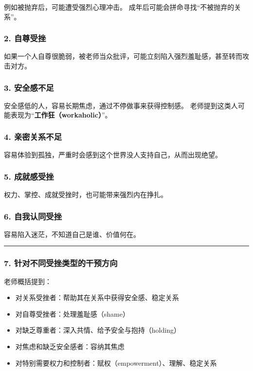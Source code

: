 \documentclass[
  chinese,
  9pt,
  a4paper,
]{ctexart}
\providecommand{\tightlist}{%
  \setlength{\itemsep}{0pt}\setlength{\parskip}{0pt}}
\begin{document}
例如被抛弃后，可能遭受强烈心理冲击。
成年后可能会拼命寻找``不被抛弃的关系''。

\subsubsection{2. 自尊受挫}\label{ux81eaux5c0aux53d7ux632b}

如果一个人自尊很脆弱，被老师当众批评，可能立刻陷入强烈羞耻感，甚至转而攻击对方。

\subsubsection{3. 安全感不足}\label{ux5b89ux5168ux611fux4e0dux8db3}

安全感低的人，容易长期焦虑，通过不停做事来获得控制感。
老师提到这类人可能表现为``\textbf{工作狂（workaholic）}''。

\subsubsection{4.
亲密关系不足}\label{ux4eb2ux5bc6ux5173ux7cfbux4e0dux8db3}

容易体验到孤独，严重时会感到这个世界没人支持自己，从而出现绝望。

\subsubsection{5. 成就感受挫}\label{ux6210ux5c31ux611fux53d7ux632b}

权力、掌控、成就受挫时，也可能带来强烈内在挣扎。

\subsubsection{6.
自我认同受挫}\label{ux81eaux6211ux8ba4ux540cux53d7ux632b}

容易陷入迷茫，不知道自己是谁、价值何在。

\begin{center}\rule{0.5\linewidth}{0.5pt}\end{center}

\subsubsection{7.
针对不同受挫类型的干预方向}\label{ux9488ux5bf9ux4e0dux540cux53d7ux632bux7c7bux578bux7684ux5e72ux9884ux65b9ux5411}

老师概括提到：

\begin{itemize}
\tightlist
\item
  对关系受挫者：帮助其在关系中获得安全感、稳定关系
\item
  对自尊受挫者：处理羞耻感（shame）
\item
  对缺乏尊重者：深入共情、给予安全与抱持（holding）
\item
  对焦虑和缺乏安全感者：容纳其焦虑
\item
  对特别需要权力和控制者：赋权（empowerment）、理解、稳定关系
\end{itemize}
\end{document}
